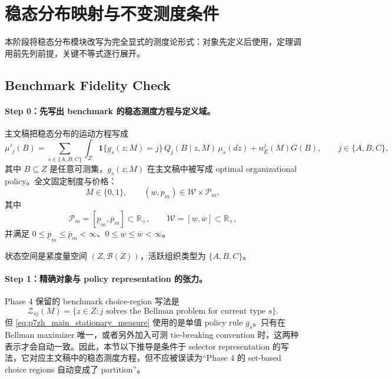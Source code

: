 \section{稳态分布映射与不变测度条件}

本阶段将稳态分布模块改写为完全显式的测度论形式：对象先定义后使用，定理调用前先列前提，关键不等式逐行展开。

\subsection{Benchmark Fidelity Check}

\paragraph{Step 0：先写出 benchmark 的稳态测度方程与定义域。}
主文稿把稳态分布的运动方程写成
\begin{equation}
\mu'_j(B)
=
\sum_{s\in\{A,B,C\}}\int_Z \mathbf 1\{g_s(z;M)=j\}\,Q_j(B\mid z,M)\,\mu_s(dz)
+n_E^j(M)G(B),
\qquad j\in\{A,B,C\},
\label{eq:p7zh_main_stationary_measure}
\end{equation}
其中 $B\subseteq Z$ 是任意可测集，$g_s(z;M)$ 在主文稿中被写成 optimal organizational policy。全文固定制度与价格：
\[
M\in\{0,1\},
\qquad
(w,p_m)\in\mathcal W\times\mathcal P_m,
\]
其中
\[
\mathcal P_m=[\underline p_m,\overline p_m]\subset\mathbb R_+,
\qquad
\mathcal W=[\underline w,\overline w]\subset\mathbb R_+,
\]
并满足 $0\le\underline p_m\le\overline p_m<\infty$、$0\le\underline w\le\overline w<\infty$。

状态空间是紧度量空间 $(Z,\mathcal B(Z))$，活跃组织类型为 $\{A,B,C\}$。

\paragraph{Step 1：精确对象与 policy representation 的张力。}
Phase 4 保留的 benchmark choice-region 写法是
\[
\mathcal Z_{sj}(M)=\{z\in Z: j \text{ solves the Bellman problem for current type }s\}.
\]
但 \eqref{eq:p7zh_main_stationary_measure} 使用的是单值 policy rule $g_s$。只有在 Bellman maximizer 唯一，或者另外加入可测 tie-breaking convention 时，这两种表示才会自动一致。因此，本节以下推导是条件于 selector representation 的写法，它对应主文稿中的稳态测度方程，但不应被误读为“Phase 4 的 set-based choice regions 自动变成了 partition”。

